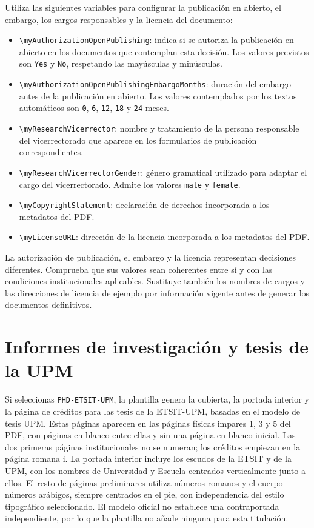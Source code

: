 Utiliza las siguientes variables para configurar la publicación en abierto, el embargo, los cargos responsables y la licencia del documento:

\begin{itemize}
  \item \texttt{\textbackslash{}myAuthorizationOpenPublishing}: indica si se autoriza la publicación en abierto en los documentos que contemplan esta decisión. Los valores previstos son \texttt{Yes} y \texttt{No}, respetando las mayúsculas y minúsculas.
  \item \texttt{\textbackslash{}myAuthorizationOpenPublishingEmbargoMonths}: duración del embargo antes de la publicación en abierto. Los valores contemplados por los textos automáticos son \texttt{0}, \texttt{6}, \texttt{12}, \texttt{18} y \texttt{24} meses.
  \item \texttt{\textbackslash{}myResearchVicerrector}: nombre y tratamiento de la persona responsable del vicerrectorado que aparece en los formularios de publicación correspondientes.
  \item \texttt{\textbackslash{}myResearchVicerrectorGender}: género gramatical utilizado para adaptar el cargo del vicerrectorado. Admite los valores \texttt{male} y \texttt{female}.
  \item \texttt{\textbackslash{}myCopyrightStatement}: declaración de derechos incorporada a los metadatos del PDF.
  \item \texttt{\textbackslash{}myLicenseURL}: dirección de la licencia incorporada a los metadatos del PDF.
\end{itemize}

La autorización de publicación, el embargo y la licencia representan decisiones diferentes. Comprueba que sus valores sean coherentes entre sí y con las condiciones institucionales aplicables. Sustituye también los nombres de cargos y las direcciones de licencia de ejemplo por información vigente antes de generar los documentos definitivos.

\section{Informes de investigación y tesis de la UPM}

Si seleccionas \texttt{PHD-ETSIT-UPM}, la plantilla genera la cubierta, la portada interior y la página de créditos para las tesis de la ETSIT-UPM, basadas en el modelo de tesis UPM. Estas páginas aparecen en las páginas físicas impares 1, 3 y 5 del PDF, con páginas en blanco entre ellas y sin una página en blanco inicial. Las dos primeras páginas institucionales no se numeran; los créditos empiezan en la página romana i. La portada interior incluye los escudos de la ETSIT y de la UPM, con los nombres de Universidad y Escuela centrados verticalmente junto a ellos. El resto de páginas preliminares utiliza números romanos y el cuerpo números arábigos, siempre centrados en el pie, con independencia del estilo tipográfico seleccionado. El modelo oficial no establece una contraportada independiente, por lo que la plantilla no añade ninguna para esta titulación.

